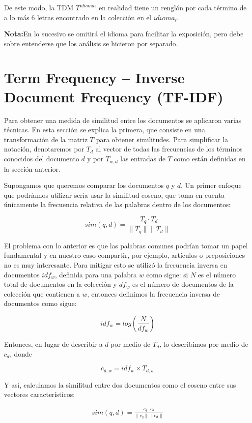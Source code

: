De este modo, la TDM $T^{idioma_i}$ en realidad tiene un renglón por cada término de a lo más 6 letras encontrado en la colección en el $idioma_i$. 

\textbf{Nota:}En lo sucesivo se omitirá el idioma para facilitar la exposición, pero debe sobre entenderse que los análisis se hicieron por separado.

\section{Term Frequency – Inverse Document Frequency (TF-IDF) }

Para obtener una medida de similitud entre los documentos se aplicaron varias técnicas. En esta sección se explica la primera, que consiste en una transformación de la matriz $T$ para obtener similitudes. Para simplificar la notación, denotaremos por $T_d$ al vector de todas las frecuencias de los términos conocidos del documento $d$ y por $T_{w,d}$ las entradas de $T$ como están definidas en la sección anterior.

Supongamos que queremos comparar los documentos $q$ y $d$. Un primer enfoque que podríamos utilizar sería usar la similitud coseno, que toma en cuenta únicamente la frecuencia relativa de las palabras dentro de los documentos:

$$
sim(q,d) = \frac{T_q \cdot T_d}{\|T_q\| \|T_d\|}
$$

El problema con lo anterior es que las palabras comunes podrían tomar un papel fundamental y en nuestro caso compartir, por ejemplo, artículos o preposiciones no es muy interesante. Para mitigar esto se utilizó la frecuencia inversa en documentos $idf_w$, definida para una palabra $w$ como sigue: si $N$ es el número total de documentos en la colección y $df_w$ es el número de documentos de la colección que contienen a $w$, entonces definimos la frecuencia inversa de documentos como sigue:

$$
idf_w = log(\frac{N}{df_w}) 
$$

Entonces, en lugar de describir a $d$ por medio de $T_d$, lo describimos por medio de $c_d$, donde

$$
c_{d,w} = idf_w \times T_{d,w}
$$

Y así, calculamos la similitud entre dos documentos como el coseno entre sus vectores característicos:

\begin{align} \label{f:simcos}
sim(q,d) = \frac{c_q \cdot c_d}{\|c_q\| \|c_d\|}
\end{align}

